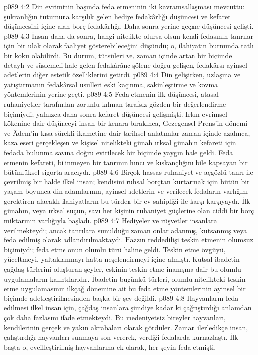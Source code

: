 \vs p089 4:2 Din evriminin başında feda etmeninin iki kavramsallaşması mevcuttu: şükranlığın tutumuna karşılık gelen hediye fedakârlığı düşüncesi ve kefaret düşüncesini içine alan borç fedakârlığı. Daha sonra yerine geçme düşüncesi gelişti.
\vs p089 4:3 İnsan daha da sonra, hangi nitelikte olursa olsun kendi fedasının tanrılar için bir ulak olarak faaliyet gösterebileceğini düşündü; o, ilahiyatın burnunda tatlı bir koku olabilirdi. Bu durum, tütsüleri ve, zaman içinde artan bir biçimde detaylı ve süslemeli hale gelen fedakârâne şölene doğru gelişen, fedakârsı ayinsel adetlerin diğer estetik özelliklerini getirdi.
\vs p089 4:4 Din gelişirken, uzlaşma ve yatıştırmanın fedakârsal usulleri eski kaçınma, sakinleştirme ve kovma yöntemlerinin yerine geçti.
\vs p089 4:5 Feda etmenin ilk düşüncesi, atasal ruhaniyetler tarafından zorunlu kılınan tarafsız gözden bir değerlendirme biçimiydi; yalnızca daha sonra kefaret düşüncesi gelişmişti. Irkın evrimsel kökenine dair düşünceyi insan bir kenara bırakınca, Gezegensel Prens’in dönemi ve Âdem’in kısa sürekli ikametine dair tarihsel anlatımlar zaman içinde azalınca, kaza eseri gerçekleşen ve kişisel nitelikteki günah ırksal günahın kefareti için fedada bulunma savına doğru evirilecek bir biçimde yaygın hale geldi. Feda etmenin kefareti, bilinmeyen bir tanrının hıncı ve kıskançlığını bile kapsayan bir bütünlüksel sigorta aracıydı.
\vs p089 4:6 Birçok hassas ruhaniyet ve açgözlü tanrı ile çevrilmiş bir halde ilkel insan; kendisini ruhsal borçtan kurtarmak için bütün bir yaşam boyunca din adamlarının, ayinsel adetlerin ve verilecek fedaların varlığını gerektiren alacaklı ilahiyatların bu türden bir ev sahipliği ile karşı karşıyaydı. İlk günahın, veya ırksal suçun, savı her kişinin ruhaniyet güçlerine olan ciddi bir borç miktarının varlığıyla başladı.
\vs p089 4:7 Hediyeler ve rüşvetler insanlara verilmekteydi; ancak tanrılara sunulduğu zaman onlar adanmış, kutsanmış veya feda edilmiş olarak adlandırılmaktaydı. Hazzın reddedilişi teskin etmenin olumsuz biçimiydi; feda etme onun olumlu türü haline geldi. Teskin etme övgüyü, yüceltmeyi, yaltaklanmayı hatta neşelendirmeyi içine almıştı. Kutsal ibadetin çağdaş türlerini oluşturan şeyler, eskinin teskin etme inanışına dair bu olumlu uygulamaların kalıntılarıdır. İbadetin bugünkü türleri, olumlu nitelikteki teskin etme uygulamasının ilkçağ dönemine ait bu feda etme yöntemlerinin ayinsel bir biçimde adetleştirilmesinden başka bir şey değildi.
\vs p089 4:8 Hayvanların feda edilmesi ilkel insan için, çağdaş insanlara şimdiye kadar ki çağrıştırdığı anlamdan çok daha fazlasını ifade etmekteydi. Bu medeniyetsiz bireyler hayvanları, kendilerinin gerçek ve yakın akrabaları olarak gördüler. Zaman ilerledikçe insan, çalıştırdığı hayvanları sunmaya son vererek, verdiği fedalarda kurnazlaştı. İlk başta o, evcilleştirilmiş hayvanlarına ek olarak, her şeyin  feda etmişti.

